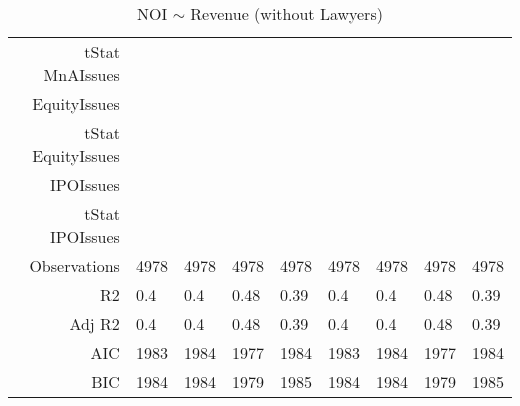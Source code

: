 \begin{table}[ht]
\begin{tabular}{rllllllll}
  tStat MnAIssues &  &  &  &  &  &  &  &  \\ 
  EquityIssues &  &  &  &  &  &  &  &  \\ 
  tStat EquityIssues &  &  &  &  &  &  &  &  \\ 
  IPOIssues &  &  &  &  &  &  &  &  \\ 
  tStat IPOIssues &  &  &  &  &  &  &  &  \\ 
  Observations & 4978 & 4978 & 4978 & 4978 & 4978 & 4978 & 4978 & 4978 \\ 
  R2 & 0.4 & 0.4 & 0.48 & 0.39 & 0.4 & 0.4 & 0.48 & 0.39 \\ 
  Adj R2 & 0.4 & 0.4 & 0.48 & 0.39 & 0.4 & 0.4 & 0.48 & 0.39 \\ 
  AIC & 1983 & 1984 & 1977 & 1984 & 1983 & 1984 & 1977 & 1984 \\ 
  BIC & 1984 & 1984 & 1979 & 1985 & 1984 & 1984 & 1979 & 1985 \\ 
   \hline
\end{tabular}
\caption{NOI $\sim$ Revenue (without Lawyers)} 
\end{table}
